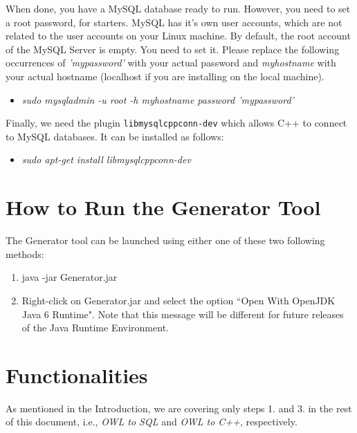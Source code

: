 \documentclass[12pt]{article}
\begin{document}
When done, you have a MySQL database ready to run. However, you need to set a root password, for starters.
MySQL has it's own user accounts, which are not related to the user accounts on your Linux machine.
By default, the root account of the MySQL Server is empty. You need to set it.
Please replace the following occurrences of \textit{'mypassword'} with your actual password and \textit{myhostname} with your actual hostname (localhost if you are installing on the local machine).

\begin{itemize}
 \item \textit{sudo mysqladmin -u root -h myhostname password 'mypassword'}
\end{itemize}

Finally, we need the plugin \texttt{libmysqlcppconn-dev} which allows C++ to connect to MySQL databases. It can be installed as follows:
\begin{itemize}
 \item \textit{sudo apt-get install libmysqlcppconn-dev}
\end{itemize}

\section{How to Run the Generator Tool}\label{s:run}
The Generator tool can be launched using either one of these two following methods:
\begin{enumerate}
 \item java -jar Generator.jar
 \item Right-click on Generator.jar and select the option ``Open With OpenJDK Java 6 Runtime". Note that this message will be different for future releases of the Java Runtime Environment.
\end{enumerate}


\section{Functionalities}\label{s:generator}
As mentioned in the Introduction, we are covering only steps 1. and 3. in the rest of this document, i.e., \textit{OWL to SQL} and \textit{OWL to C++}, respectively.
\end{document}
